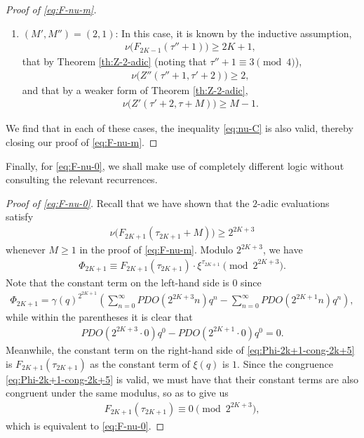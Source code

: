 \documentclass[12pt,reqno]{amsart}
\numberwithin{equation}{section}
\theoremstyle{theorem}
\theoremstyle{definition}
\begin{document}
\begin{proof}[Proof of \eqref{eq:F-nu-m}]
\begin{enumerate}[label={\textbf{(\alph*).}},leftmargin=*,labelsep=0cm,align=left]
		\item $(M',M'')=(2,1)$: In this case, it is known by the inductive assumption,
		\begin{align*}
			\nu\big(F_{2K-1}(\tau'' + 1)\big) \ge 2K + 1,
		\end{align*}
		that by Theorem \ref{th:Z-2-adic} (noting that $\tau''+1\equiv 3 \pmod{4}$),
		\begin{align*}
			\nu\big(Z''(\tau'' + 1,\tau'+2)\big) \ge 2,
		\end{align*}
		and that by a weaker form of Theorem \ref{th:Z-2-adic},
		\begin{align*}
			\nu\big(Z'(\tau' + 2,\tau+M)\big) \ge M-1.
		\end{align*}
	\end{enumerate}
	We find that in each of these cases, the inequality \eqref{eq:nu-C} is also valid, thereby closing our proof of \eqref{eq:F-nu-m}.
\end{proof}

Finally, for \eqref{eq:F-nu-0}, we shall make use of completely different logic without consulting the relevant recurrences.

\begin{proof}[Proof of \eqref{eq:F-nu-0}]
	Recall that we have shown that the $2$-adic evaluations satisfy
	\begin{align*}
		\nu\big(F_{2K+1}(\tau_{2K+1}+M)\big)\ge 2^{2K+3}
	\end{align*}
	whenever $M\ge 1$ in the proof of \eqref{eq:F-nu-m}. Modulo $2^{2K+3}$, we have
	\begin{align}\label{eq:Phi-2k+1-cong-2k+5}
		\Phi_{2K+1} \equiv F_{2K+1}(\tau_{2K+1})\cdot \xi^{\tau_{2K+1}} \pmod{2^{2K+3}}.
	\end{align}
	Note that the constant term on the left-hand side is $0$ since
	\begin{align*}
		\Phi_{2K+1}=\gamma(q)^{2^{2K+1}}\left(\sum_{n=0}^\infty PDO(2^{2K+3}n)q^n - \sum_{n=0}^\infty PDO(2^{2K+1}n)q^n\right),
	\end{align*}
	while within the parentheses it is clear that
	\begin{align*}
		PDO(2^{2K+3}\cdot 0)q^0 - PDO(2^{2K+1}\cdot 0)q^0 = 0.
	\end{align*}
	Meanwhile, the constant term on the right-hand side of \eqref{eq:Phi-2k+1-cong-2k+5} is $F_{2K+1}(\tau_{2K+1})$ as the constant term of $\xi(q)$ is $1$. Since the congruence \eqref{eq:Phi-2k+1-cong-2k+5} is valid, we must have that their constant terms are also congruent under the same modulus, so as to give us
	\begin{align*}
		F_{2K+1}(\tau_{2K+1}) \equiv 0 \pmod{2^{2K+3}},
	\end{align*}
	which is equivalent to \eqref{eq:F-nu-0}.
\end{proof}
\end{document}
